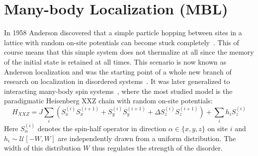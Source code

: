 \section{Many-body Localization (MBL)}
\label{sec:MBL}
In 1958 Anderson discovered that a simple particle hopping between sites in a lattice with random on-site potentials can become stuck completely~\cite{andersonAbsenceDiffusionCertain1958}. This of course means that this simple system does not thermalize at all since the memory of the initial state is retained at all times. This scenario is now known as Anderson localization and was the starting point of a whole new branch of research on localization in disordered systems~\cite{imbrieReviewLocalIntegrals2017,abaninRecentProgressManybody2017,parameswaranEigenstatePhaseTransitions2017,abaninManybodyLocalizationThermalization2019,laflorencieEntanglementEntropyLocalization2022,sierantManyBodyLocalizationAge2024}.
It was later generalized to interacting many-body spin systems~\cite{fleishmanInteractionsAndersonTransition1980,baskoMetalinsulatorTransitionWeakly2006,gornyiInteractingElectronsDisordered2005}, where the most studied model is the paradigmatic Heisenberg XXZ chain with random on-site potentials:
\begin{equation}\label{eq:XXZ-onsite}
	H_{XXZ} = J \sum_i \left(S_x^{(i)}S_x^{(i+1)} + S_y^{(i)}S_y^{(i+1)} + \Delta S_z^{(i)}S_z^{(i+1)}\right) + \sum_i h_i S_z^{(i)}
\end{equation}
Here $S_\alpha^{(i)}$ denotes the spin-half operator in direction $\alpha\in\{x,y,z\}$ on site $i$ and $h_i \sim \mathcal{U}[-W,W]$ are independently drawn from a uniform distribution. The width of this distribution $W$ thus regulates the strength of the disorder.

